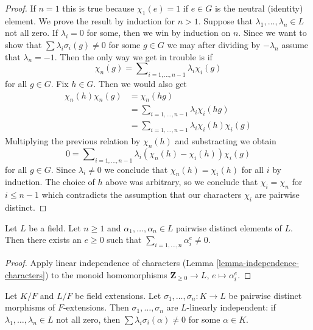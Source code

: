 \begin{proof}
If $n = 1$ this is true because $\chi_1(e) = 1$ if $e \in G$ is the
neutral (identity) element. We prove the result by induction for $n > 1$.
Suppose that $\lambda_1, \ldots, \lambda_n \in L$ not all zero.
If $\lambda_i = 0$ for some, then we win by induction on $n$.
Since we want to show that $\sum \lambda_i\sigma_i(g) \not = 0$
for some $g \in G$ we may after dividing by $-\lambda_n$
assume that $\lambda_n = -1$. Then the only way we get in trouble
is if
$$
\chi_n(g) = \sum\nolimits_{i = 1, \ldots, n - 1} \lambda_i\chi_i(g)
$$
for all $g \in G$. Fix $h \in G$. Then we would also get
\begin{align*}
\chi_n(h)\chi_n(g) & = \chi_n(hg) \\
& = \sum\nolimits_{i = 1, \ldots, n - 1} \lambda_i\chi_i(hg) \\
& = \sum\nolimits_{i = 1, \ldots, n - 1} \lambda_i\chi_i(h) \chi_i(g)
\end{align*}
Multiplying the previous relation by $\chi_n(h)$ and substracting we obtain
$$
0 = \sum\nolimits_{i = 1, \ldots, n - 1}
\lambda_i (\chi_n(h) - \chi_i(h)) \chi_i(g)
$$
for all $g \in G$. Since $\lambda_i \not = 0$ we conclude that
$\chi_n(h) = \chi_i(h)$ for all $i$ by induction.
The choice of $h$ above was arbitrary, so we conclude
that $\chi_i = \chi_n$ for $i \leq n - 1$ which contradicts
the assumption that our characters $\chi_i$ are pairwise distinct.
\end{proof}

\begin{lemma}
\label{lemma-sums-of-powers}
Let $L$ be a field. Let $n \geq 1$ and $\alpha_1, \ldots, \alpha_n \in L$
pairwise distinct elements of $L$. Then there exists an
$e \geq 0$ such that $\sum_{i = 1, \ldots, n} \alpha_i^e \not = 0$.
\end{lemma}

\begin{proof}
Apply linear independence of characters
(Lemma \ref{lemma-independence-characters})
to the monoid homomorphisms $\mathbf{Z}_{\geq 0} \to L$,
$e \mapsto \alpha_i^e$.
\end{proof}

\begin{lemma}
\label{lemma-independence-embeddings}
Let $K/F$ and $L/F$ be field extensions. Let
$\sigma_1, \ldots, \sigma_n : K \to L$ be pairwise distinct
morphisms of $F$-extensions. Then $\sigma_1, \ldots, \sigma_n$
are $L$-linearly independent: if $\lambda_1, \ldots, \lambda_n \in L$
not all zero, then $\sum \lambda_i\sigma_i(\alpha) \not = 0$
for some $\alpha \in K$.
\end{lemma}


